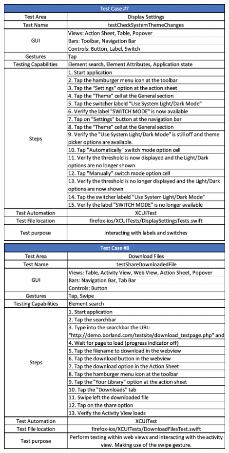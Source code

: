 \includegraphics[width=12cm]{img/tc7.png} \\[2mm]
\includegraphics[width=12cm]{img/tc8.png} \\[2mm]
